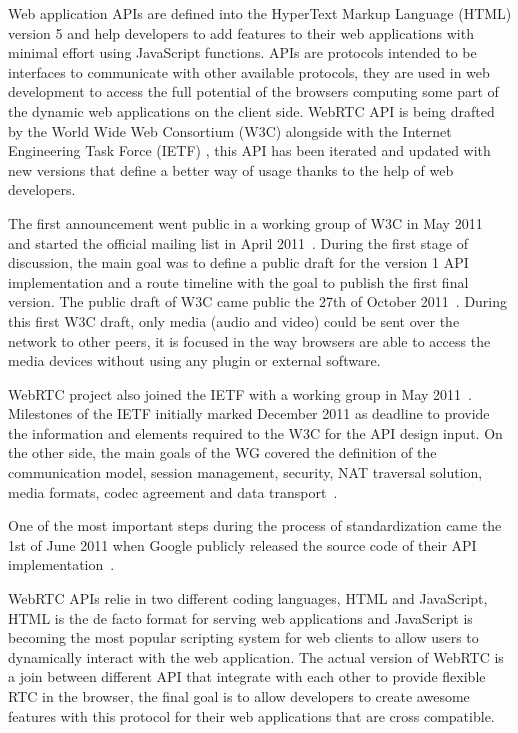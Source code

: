 Web application APIs are defined into the HyperText Markup Language (HTML)  version 5 and help developers to add features to their web applications with minimal effort using JavaScript functions. APIs are protocols intended to be interfaces to communicate with other available protocols, they are used in web development to access the full potential of the browsers computing some part of the dynamic web applications on the client side. WebRTC API is being drafted by the World Wide Web Consortium (W3C)  alongside with the Internet Engineering Task Force (IETF) , this API has been iterated and updated with new versions that define a better way of usage thanks to the help of web developers.

The first announcement went public in a working group of W3C in May 2011~\cite{webrtcW3cgroup} and started the official mailing list in April 2011~\cite{welcomeW3C}. During the first stage of discussion, the main goal was to define a public draft for the version 1 API implementation and a route timeline with the goal to publish the first final version. The public draft of W3C came public the 27th of October 2011~\cite{originalW3Cdraft}. During this first W3C draft, only media (audio and video) could be sent over the network to other peers, it is focused in the way browsers are able to access the media devices without using any plugin or external software.

WebRTC project also joined the IETF with a working group in May 2011~\cite{webrtcIETFgroup}. Milestones of the IETF initially marked December 2011 as deadline to provide the information and elements required to the W3C for the API design input. On the other side, the main goals of the WG covered the definition of the communication model, session management, security, NAT traversal solution, media formats, codec agreement and data transport~\cite{webrtcIETFcharter}.

One  of the most important steps during the process of standardization came the 1st of June 2011 when Google publicly released the source code of their API implementation~\cite{haraldpublicWebRTC}. 

WebRTC APIs relie in two different coding languages, HTML and JavaScript, HTML is the de facto format for serving web applications and JavaScript is becoming the most popular scripting system for web clients to allow users to dynamically interact with the web application. The actual version of WebRTC is a join between different API that integrate with each other to provide flexible RTC in the browser, the final goal is to allow developers to create awesome features with this protocol for their web applications that are cross compatible.

